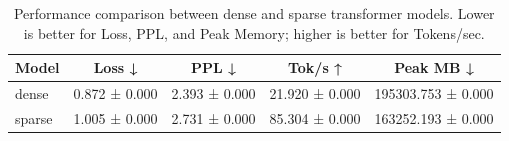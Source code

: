 \begin{table}[htbp]
\centering
\caption{Performance comparison between dense and sparse transformer models. Lower is better for Loss, PPL, and Peak Memory; higher is better for Tokens/sec.}
\label{tab:model_comparison}
\begin{tabular}{lcccc}
\toprule
Model & Loss ↓ & PPL ↓ & Tok/s ↑ & Peak MB ↓ \\
\midrule
dense & 0.872 ± 0.000 & 2.393 ± 0.000 & 21.920 ± 0.000 & 195303.753 ± 0.000 \\
sparse & 1.005 ± 0.000 & 2.731 ± 0.000 & 85.304 ± 0.000 & 163252.193 ± 0.000 \\
\bottomrule
\end{tabular}

\end{table}